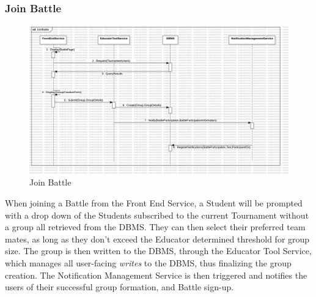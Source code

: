 \subsubsection{Join Battle}
\begin{figure}[H]
    \centering
    \includegraphics[width=\textwidth]{Graphics/Sequence Diagrams/JoinBattle.png}
    \caption{Join Battle}
    \label{fig:joinbattle}
\end{figure}
When joining a Battle from the Front End Service, a Student will be prompted with a drop down of the Students subscribed to the current Tournament without a group all retrieved from the DBMS. They can then select their preferred team mates, as long as they don't exceed the Educator determined threshold for group size.  The group is then written to the DBMS, through the Educator Tool Service, which manages all user-facing \textit{writes} to the DBMS, thus finalizing the group creation. The Notification Management Service is then triggered and notifies the users of their successful group formation, and Battle sign-up. 

